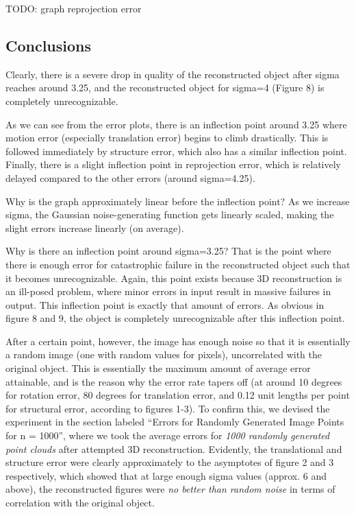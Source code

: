 \documentclass{article}
\begin{document}
TODO: graph reprojection error 


\subsection{Conclusions}

Clearly, there is a severe drop in quality of the reconstructed object after sigma reaches around 3.25, and the reconstructed object for sigma=4 (Figure 8) is completely unrecognizable.

As we can see from the error plots, there is an inflection point around 3.25 where motion error (especially translation error) begins to climb drastically. This is followed immediately by structure error, which also has a similar inflection point. Finally, there is a slight inflection point in reprojection error, which is relatively delayed compared to the other errors (around sigma=4.25).


Why is the graph approximately linear before the inflection point? As we increase sigma, the Gaussian noise-generating function gets linearly scaled, making the slight errors increase linearly (on average).

Why is there an inflection point around sigma=3.25? That is the point where there is enough error for catastrophic failure in the reconstructed object such that it becomes unrecognizable. Again, this point exists because 3D reconstruction is an ill-posed problem, where minor errors in input result in massive failures in output. This inflection point is exactly that amount of errors. As obvious in figure 8 and 9, the object is completely unrecognizable after this inflection point.


After a certain point, however, the image has enough noise so that it is essentially a random image (one with random values for pixels), uncorrelated with the original object. This is essentially the maximum amount of average error attainable, and is the reason why the error rate tapers off (at around 10 degrees for rotation error, 80 degrees for translation error, and 0.12 unit lengths per point for structural error, according to figures 1-3). To confirm this, we devised the experiment in the section labeled ``Errors for Randomly Generated Image Points for n = 1000'', where we took the average errors for \textit{1000 randomly generated point clouds} after attempted 3D reconstruction. Evidently, the translational and structure error were clearly approximately to the asymptotes of figure 2 and 3 respectively, which showed that at large enough sigma values (approx. 6 and above), the reconstructed figures were \textit{no better than random noise} in terms of correlation with the original object.
\end{document}
